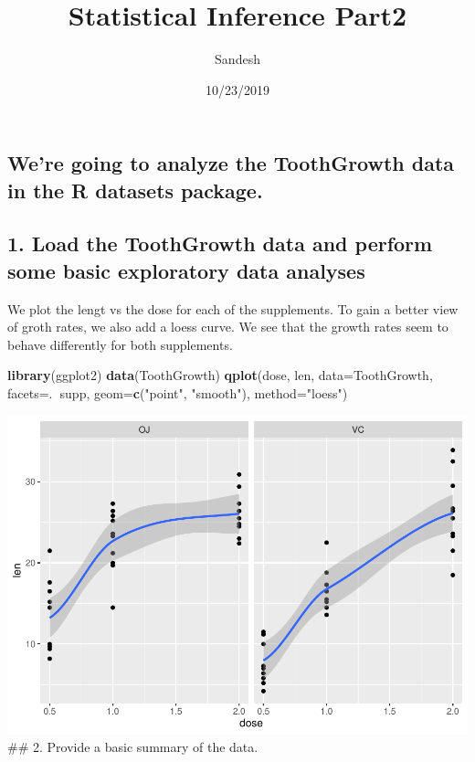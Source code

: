 \documentclass[]{article}
\title{Statistical Inference Part2}
\author{Sandesh}
\date{10/23/2019}
\newenvironment{Shaded}{\begin{snugshade}}{\end{snugshade}}
\newcommand{\DataTypeTok}[1]{\textcolor[rgb]{0.13,0.29,0.53}{#1}}
\newcommand{\KeywordTok}[1]{\textcolor[rgb]{0.13,0.29,0.53}{\textbf{#1}}}
\newcommand{\NormalTok}[1]{#1}
\newcommand{\OperatorTok}[1]{\textcolor[rgb]{0.81,0.36,0.00}{\textbf{#1}}}
\newcommand{\StringTok}[1]{\textcolor[rgb]{0.31,0.60,0.02}{#1}}
\begin{document}
\maketitle

\hypertarget{were-going-to-analyze-the-toothgrowth-data-in-the-r-datasets-package.}{%
\subsection{We're going to analyze the ToothGrowth data in the R
datasets
package.}\label{were-going-to-analyze-the-toothgrowth-data-in-the-r-datasets-package.}}

\hypertarget{load-the-toothgrowth-data-and-perform-some-basic-exploratory-data-analyses}{%
\subsection{1. Load the ToothGrowth data and perform some basic
exploratory data
analyses}\label{load-the-toothgrowth-data-and-perform-some-basic-exploratory-data-analyses}}

We plot the lengt vs the dose for each of the supplements. To gain a
better view of groth rates, we also add a loess curve. We see that the
growth rates seem to behave differently for both supplements.

\begin{Shaded}
\begin{Highlighting}[]
\KeywordTok{library}\NormalTok{(ggplot2)}
\KeywordTok{data}\NormalTok{(ToothGrowth)}
\KeywordTok{qplot}\NormalTok{(dose, len, }\DataTypeTok{data=}\NormalTok{ToothGrowth, }\DataTypeTok{facets=}\NormalTok{.}\OperatorTok{~}\NormalTok{supp, }\DataTypeTok{geom=}\KeywordTok{c}\NormalTok{(}\StringTok{"point"}\NormalTok{, }\StringTok{"smooth"}\NormalTok{), }\DataTypeTok{method=}\StringTok{"loess"}\NormalTok{)}
\end{Highlighting}
\end{Shaded}

\includegraphics{Part2_files/figure-latex/unnamed-chunk-1-1.pdf} \#\# 2.
Provide a basic summary of the data.
\end{document}
